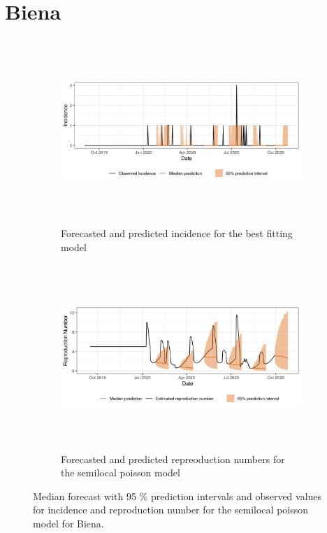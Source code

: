  \section{ Biena }\begin{figure}[H]\begin{subfigure}{\textwidth}  \centering  \includegraphics[width=0.9\linewidth, height=7cm]{../output/Biena_predictions.png}  \caption{Forecasted and predicted incidence for the best fitting model}\end{subfigure}

\begin{subfigure}{\textwidth}  \centering  \includegraphics[width=0.9\linewidth, height=7cm]{../output/Biena_Rs.png}  \caption{Forecasted and predicted repreoduction numbers for the semilocal poisson model}\end{subfigure}  \caption{Median forecast with 95 \% prediction intervals and observed values for incidence and reproduction number for the semilocal poisson model for Biena.}\end{figure}

